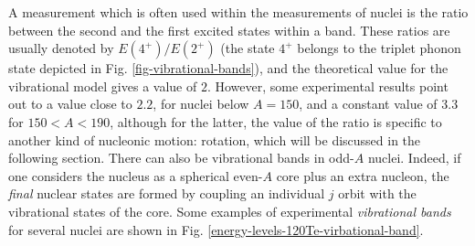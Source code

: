 A measurement which is often used within the measurements of nuclei is the ratio between the second and the first excited states within a band. These ratios are usually denoted by $E(4^+)/E(2^+)$ (the state $4^+$ belongs to the triplet phonon state depicted in Fig. \ref{fig-vibrational-bands}), and the theoretical value for the vibrational model gives a value of $2$. However, some experimental results point out to a value close to $2.2$, for nuclei below $A=150$, and a constant value of $3.3$ for $150<A<190$, although for the latter, the value of the ratio is specific to another kind of nucleonic motion: rotation, which will be discussed in the following section.
There can also be vibrational bands in odd-$A$ nuclei. Indeed, if one considers the nucleus as a spherical even-$A$ core plus an extra nucleon, the \emph{final} nuclear states are formed by coupling an individual $j$ orbit with the vibrational states of the core. Some examples of experimental \emph{vibrational bands} for several nuclei are shown in Fig. \ref{energy-levels-120Te-virbational-band}.

